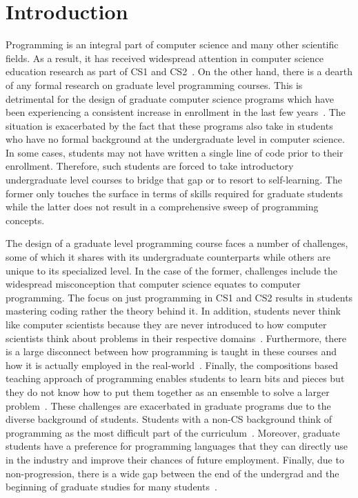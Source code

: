\documentclass[letterpaper,twocolumn,10pt]{article}
\begin{document}
\section{Introduction}
Programming is an integral part of computer science and many other scientific
fields. As a result, it has received widespread attention in computer science
education research as part of CS1 and
CS2~\cite{Turner:2005:TES,Howe:2004:CAC,Yarosh:2007:NDS,Caspersen:2009:SFP,Davies:2011:SCP}.
On the other hand, there is a dearth of any formal research on graduate level
programming courses. This is detrimental for the design of graduate computer
science programs which have been experiencing a consistent increase in
enrollment in the last few years~\cite{Zweben:2012:CDA}. The situation is
exacerbated by the fact that these programs also take in students who have no
formal background at the undergraduate level in computer science. In some cases,
students may not have written a single line of code prior to their enrollment.
Therefore, such students are forced to take introductory undergraduate level
courses to bridge that gap or to resort to self-learning. The former only
touches the surface in terms of skills required for graduate students while the
latter does not result in a comprehensive sweep of programming concepts.

The design of a graduate level programming course faces a number of challenges,
some of which it shares with its undergraduate counterparts while others are
unique to its specialized level. In the case of the former, challenges include
the widespread misconception that computer science equates to computer
programming. The focus on just programming in CS1 and CS2 results in students
mastering coding rather the theory behind it. In addition, students never think
like computer scientists because they are never introduced to how computer
scientists think about problems in their respective
domains~\cite{Turner:2005:TES}. Furthermore, there is a large disconnect between
how programming is taught in these courses and how it is actually employed in
the real-world~\cite{Howe:2004:CAC,Yarosh:2007:NDS}. Finally, the compositions
based teaching approach of programming enables students to learn bits and pieces
but they do not know how to put them together as an ensemble to solve a larger
problem~\cite{Caspersen:2009:SFP}. These challenges are exacerbated in graduate
programs due to the diverse background of students. Students with a non-CS
background think of programming as the most difficult part of the
curriculum~\cite{Lunney:2003:JLF}. Moreover, graduate students have a preference
for programming languages that they can directly use in the industry and improve
their chances of future employment. Finally, due to non-progression, there is a
wide gap between the end of the undergrad and the beginning of graduate studies
for many students~\cite{Lunney:2003:JLF}.
\end{document}
